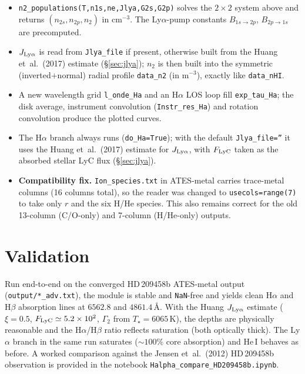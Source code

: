 \documentclass[english,a4paper]{kiseon_memo}
\begin{document}
\begin{itemize}
  \item \texttt{n2\_populations(T,n1s,ne,Jlya,G2s,G2p)} solves the
    $2\times2$ system above and returns $(n_{2s},n_{2p},n_2)$ in
    cm$^{-3}$. The Ly$\alpha$-pump constants $B_{1s\to2p}$, $B_{2p\to1s}$
    are precomputed.
  \item $J_{\rm Ly\alpha}$ is read from \texttt{Jlya\_file} if present,
    otherwise built from the Huang et~al.~(2017) estimate
    (\S\ref{sec:jlya}); $n_2$ is then built into the symmetric
    (inverted$+$normal) radial profile \texttt{data\_n2} (in m$^{-3}$),
    exactly like \texttt{data\_nHI}.
  \item A new wavelength grid \texttt{l\_onde\_Ha} and an H$\alpha$ LOS
    loop fill \texttt{exp\_tau\_Ha}; the disk average, instrument
    convolution (\texttt{Instr\_res\_Ha}) and rotation convolution
    produce the plotted curves.
  \item The H$\alpha$ branch always runs (\texttt{do\_Ha=True}); with the
    default \texttt{Jlya\_file=''} it uses the Huang et~al.~(2017)
    estimate for $J_{\rm Ly\alpha}$, with $F_{\rm LyC}$ taken as the
    absorbed stellar LyC flux (\S\ref{sec:jlya}).
  \item \textbf{Compatibility fix.} \texttt{Ion\_species.txt} in
    ATES-metal carries trace-metal columns (16 columns total), so the
    reader was changed to \texttt{usecols=range(7)} to take only
    $r$ and the six H/He species. This also remains correct for the old
    13-column (C/O-only) and 7-column (H/He-only) outputs.
\end{itemize}

\section{Validation}

Run end-to-end on the converged HD\,209458b ATES-metal output
(\texttt{output/*\_adv.txt}), the module is stable and \texttt{NaN}-free
and yields clean H$\alpha$ and H$\beta$ absorption lines at $6562.8$ and
$4861.4$\,\AA{}. With the Huang $J_{\rm Ly\alpha}$ estimate
($\xi=0.5$, $F_{\rm LyC}\simeq5.2\times10^{2}$, $\Gamma_2$ from
$T_\star=6065\,$K), the depths are physically reasonable and the
H$\alpha$/H$\beta$ ratio reflects saturation (both optically thick). The
Ly$\alpha$ branch in the same run saturates ($\sim100\%$ core absorption)
and He\,I behaves as before. A worked comparison against the
Jensen et~al.~(2012) HD\,209458b observation is provided in the notebook
\texttt{Halpha\_compare\_HD209458b.ipynb}.
\end{document}
